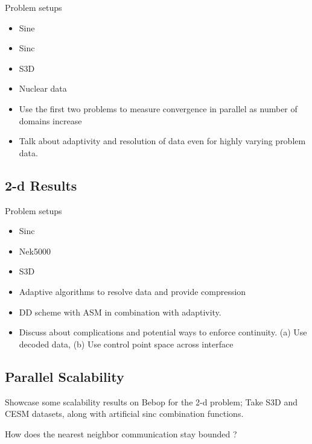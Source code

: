 \documentclass[conference]{IEEEtran}
\begin{document}
Problem setups
\begin{itemize}
  \item Sine
  \item Sinc
  \item S3D
  \item Nuclear data
\end{itemize}

\begin{itemize}
	\item Use the first two problems to measure convergence in parallel as number of domains increase
	\item Talk about adaptivity and resolution of data even for highly varying problem data.
\end{itemize}

\subsection{2-d Results}

Problem setups
\begin{itemize}
	\item Sinc
	\item Nek5000
	\item S3D
\end{itemize}


\begin{itemize}
	\item Adaptive algorithms to resolve data and provide compression
	\item DD scheme with ASM in combination with adaptivity.
	\item Discuss about complications and potential ways to enforce continuity. (a) Use decoded data, (b) Use control point space across interface
\end{itemize}

\subsection{Parallel Scalability}

Showcase some scalability results on Bebop for the 2-d problem; Take S3D and CESM datasets, along with artificial sinc combination functions.

How does the nearest neighbor communication stay bounded ?

\end{document}
